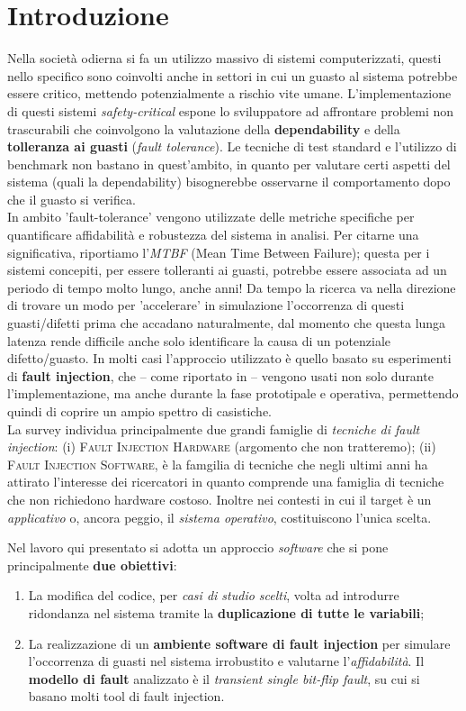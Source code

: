 \section{Introduzione}
Nella società odierna si fa un utilizzo massivo di sistemi computerizzati, questi nello specifico sono coinvolti anche in settori in cui un guasto al sistema potrebbe essere critico, mettendo potenzialmente a rischio vite umane. L'implementazione di questi sistemi \textit{safety-critical} espone lo sviluppatore ad affrontare problemi non trascurabili che coinvolgono la valutazione della \textbf{dependability}  e della \textbf{tolleranza ai guasti} (\textit{fault tolerance}). Le tecniche di test standard e l'utilizzo di benchmark non bastano in quest'ambito, in quanto per valutare certi aspetti del sistema (quali la dependability) bisognerebbe osservarne il comportamento dopo che il guasto si verifica. \\
In ambito 'fault-tolerance' vengono utilizzate delle metriche specifiche per quantificare affidabilità e robustezza del sistema in analisi. Per citarne una significativa, riportiamo l'\textit{MTBF} (Mean Time Between Failure); questa per i sistemi concepiti, per essere tolleranti ai guasti, potrebbe essere associata ad un periodo di tempo molto lungo, anche anni! Da tempo la ricerca va nella direzione di trovare un modo per 'accelerare' in simulazione l'occorrenza di questi guasti/difetti prima che accadano naturalmente, dal momento che questa lunga latenza rende difficile anche solo identificare la causa di un potenziale difetto/guasto. In molti casi l'approccio utilizzato è quello basato su esperimenti di \textbf{fault injection}, che -- come riportato in \cite{depend} -- vengono usati non solo durante l'implementazione, ma anche durante la fase prototipale e operativa, permettendo quindi di coprire un ampio spettro di casistiche.\\
La survey \cite{hsueh1997fault} individua principalmente due grandi famiglie di \textit{tecniche di fault injection}:
(i) \textsc{Fault Injection Hardware} (argomento che non tratteremo); (ii) \textsc{Fault Injection Software}, è la famgilia  di tecniche che negli ultimi anni ha attirato l'interesse dei ricercatori in quanto comprende una famiglia di tecniche che non richiedono hardware costoso. Inoltre nei contesti in cui il target è un \textit{applicativo} o, ancora peggio, il \textit{sistema operativo}, costituiscono l'unica scelta.

\noindent
Nel lavoro qui presentato si adotta un approccio \textit{software} che si pone principalmente \textbf{due obiettivi}: 
\begin{enumerate}
    \itemsep-0.3em
    \item La modifica del codice, per \textit{casi di studio scelti}, volta ad introdurre ridondanza nel sistema tramite la \textbf{duplicazione di tutte le variabili}; 
    \item La realizzazione di un \textbf{ambiente software di fault injection} per simulare l'occorrenza di guasti nel sistema irrobustito e valutarne l'\textit{affidabilità}. Il \textbf{modello di fault} analizzato è il \textit{transient single bit-flip fault}, su cui si basano molti tool di fault injection. 
\end{enumerate}

